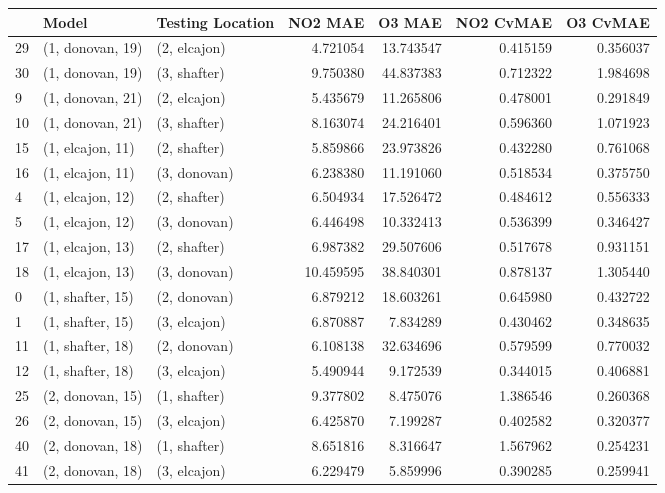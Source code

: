 \begin{tabular}{lllrrrr}
\toprule
{} &             Model & Testing Location &    NO2 MAE &     O3 MAE &  NO2 CvMAE &  O3 CvMAE \\
\midrule
29 &  (1, donovan, 19) &     (2, elcajon) &   4.721054 &  13.743547 &   0.415159 &  0.356037 \\
30 &  (1, donovan, 19) &     (3, shafter) &   9.750380 &  44.837383 &   0.712322 &  1.984698 \\
9  &  (1, donovan, 21) &     (2, elcajon) &   5.435679 &  11.265806 &   0.478001 &  0.291849 \\
10 &  (1, donovan, 21) &     (3, shafter) &   8.163074 &  24.216401 &   0.596360 &  1.071923 \\
15 &  (1, elcajon, 11) &     (2, shafter) &   5.859866 &  23.973826 &   0.432280 &  0.761068 \\
16 &  (1, elcajon, 11) &     (3, donovan) &   6.238380 &  11.191060 &   0.518534 &  0.375750 \\
4  &  (1, elcajon, 12) &     (2, shafter) &   6.504934 &  17.526472 &   0.484612 &  0.556333 \\
5  &  (1, elcajon, 12) &     (3, donovan) &   6.446498 &  10.332413 &   0.536399 &  0.346427 \\
17 &  (1, elcajon, 13) &     (2, shafter) &   6.987382 &  29.507606 &   0.517678 &  0.931151 \\
18 &  (1, elcajon, 13) &     (3, donovan) &  10.459595 &  38.840301 &   0.878137 &  1.305440 \\
0  &  (1, shafter, 15) &     (2, donovan) &   6.879212 &  18.603261 &   0.645980 &  0.432722 \\
1  &  (1, shafter, 15) &     (3, elcajon) &   6.870887 &   7.834289 &   0.430462 &  0.348635 \\
11 &  (1, shafter, 18) &     (2, donovan) &   6.108138 &  32.634696 &   0.579599 &  0.770032 \\
12 &  (1, shafter, 18) &     (3, elcajon) &   5.490944 &   9.172539 &   0.344015 &  0.406881 \\
25 &  (2, donovan, 15) &     (1, shafter) &   9.377802 &   8.475076 &   1.386546 &  0.260368 \\
26 &  (2, donovan, 15) &     (3, elcajon) &   6.425870 &   7.199287 &   0.402582 &  0.320377 \\
40 &  (2, donovan, 18) &     (1, shafter) &   8.651816 &   8.316647 &   1.567962 &  0.254231 \\
41 &  (2, donovan, 18) &     (3, elcajon) &   6.229479 &   5.859996 &   0.390285 &  0.259941 \\

\end{tabular}
